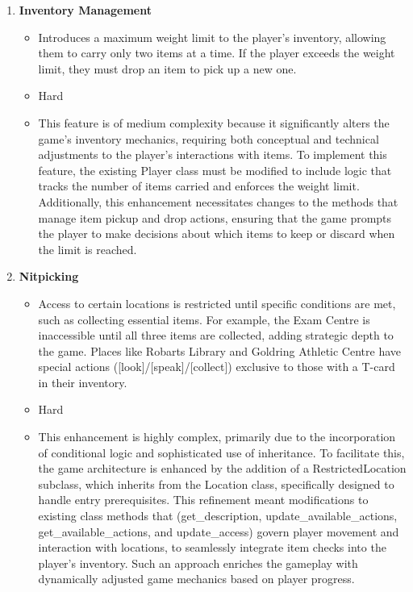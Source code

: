 \documentclass[11pt]{article}
\begin{document}
\begin{enumerate}
\begin{itemize}
	\end{itemize}
\item \textbf{Inventory Management}
	\begin{itemize}
	\item Introduces a maximum weight limit to the player's inventory, allowing them to carry only two items at a time. If the player exceeds the weight limit, they must drop an item to pick up a new one.
	\item Hard
	\item This feature is of medium complexity because it significantly alters the game's inventory mechanics, requiring both conceptual and technical adjustments to the player's interactions with items. To implement this feature, the existing Player class must be modified to include logic that tracks the number of items carried and enforces the weight limit. Additionally, this enhancement necessitates changes to the methods that manage item pickup and drop actions, ensuring that the game prompts the player to make decisions about which items to keep or discard when the limit is reached.
	\end{itemize}
 \item \textbf{Nitpicking}
	\begin{itemize}
	\item Access to certain locations is restricted until specific conditions are met, such as collecting essential items. For example, the Exam Centre is inaccessible until all three items are collected, adding strategic depth to the game. Places like Robarts Library and Goldring Athletic Centre have special actions ([look]/[speak]/[collect]) exclusive to those with a T-card in their inventory.
	\item Hard
	\item This enhancement is highly complex, primarily due to the incorporation of conditional logic and sophisticated use of inheritance. To facilitate this, the game architecture is enhanced by the addition of a RestrictedLocation subclass, which inherits from the Location class, specifically designed to handle entry prerequisites. This refinement meant modifications to existing class methods that (get\_description, update\_available\_actions, get\_available\_actions, and update\_access) govern player movement and interaction with locations, to seamlessly integrate item checks into the player's inventory. Such an approach enriches the gameplay with dynamically adjusted game mechanics based on player progress.

\end{itemize}
\end{enumerate}
\end{document}
